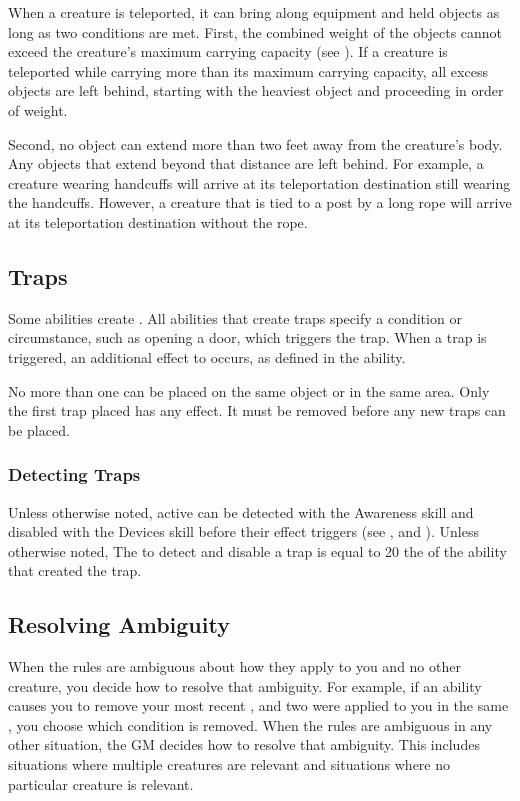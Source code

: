         When a creature is teleported, it can bring along equipment and held objects as long as two conditions are met.
        First, the combined weight of the objects cannot exceed the creature's maximum carrying capacity (see ).
        If a creature is teleported while carrying more than its maximum carrying capacity, all excess objects are left behind, starting with the heaviest object and proceeding in order of weight.

        Second, no object can extend more than two feet away from the creature's body.
        Any objects that extend beyond that distance are left behind.
        For example, a creature wearing handcuffs will arrive at its teleportation destination still wearing the handcuffs.
        However, a creature that is tied to a post by a long rope will arrive at its teleportation destination without the rope.

    \subsection{Traps}\label{Traps}
        Some abilities create .
        All abilities that create traps specify a condition or circumstance, such as opening a door, which triggers the trap.
        When a trap is triggered, an additional effect to occurs, as defined in the ability.

        No more than one  can be placed on the same object or in the same area.
        Only the first trap placed has any effect.
        It must be removed before any new traps can be placed.

        \subsubsection{Detecting Traps}\label{Detecting Traps}
            Unless otherwise noted, active  can be detected with the Awareness skill and disabled with the Devices skill before their effect triggers (see , and ).
            Unless otherwise noted, The  to detect and disable a trap is equal to 20 \add the  of the ability that created the trap.

    \subsection{Resolving Ambiguity}\label{Resolving Ambiguity}
        When the rules are ambiguous about how they apply to you and no other creature, you decide how to resolve that ambiguity.
        For example, if an ability causes you to remove your most recent , and two  were applied to you in the same , you choose which condition is removed.
        When the rules are ambiguous in any other situation, the GM decides how to resolve that ambiguity.
        This includes situations where multiple creatures are relevant and situations where no particular creature is relevant.

